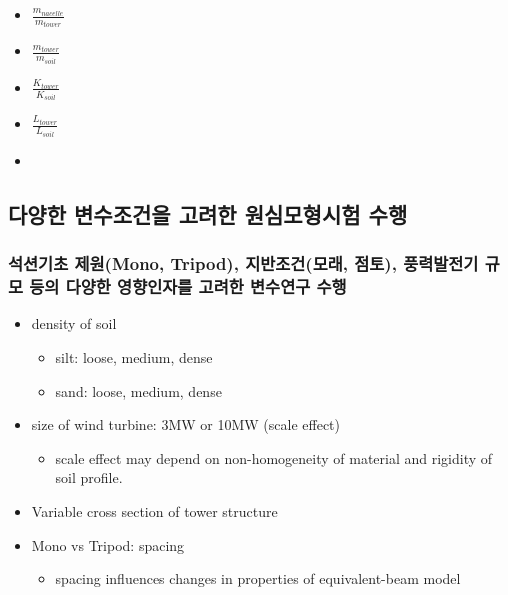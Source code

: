 \documentclass[
  letterpaper,
  DIV=11,
  numbers=noendperiod]{scrreprt}
\providecommand{\tightlist}{%
  \setlength{\itemsep}{0pt}\setlength{\parskip}{0pt}}\usepackage{longtable,booktabs,array}
\begin{document}
\begin{itemize}
\tightlist
\item
  \(\frac{m_{nacelle}}{m_{tower}}\)
\item
  \(\frac{m_{tower}}{m_{soil}}\)
\item
  \(\frac{K_{tower}}{K_{soil}}\)
\item
  \(\frac{L_{tower}}{L_{soil}}\)
\item
\end{itemize}

\hypertarget{uxb2e4uxc591uxd55c-uxbcc0uxc218uxc870uxac74uxc744-uxace0uxb824uxd55c-uxc6d0uxc2ecuxbaa8uxd615uxc2dcuxd5d8-uxc218uxd589}{%
\subsection{다양한 변수조건을 고려한 원심모형시험
수행}\label{uxb2e4uxc591uxd55c-uxbcc0uxc218uxc870uxac74uxc744-uxace0uxb824uxd55c-uxc6d0uxc2ecuxbaa8uxd615uxc2dcuxd5d8-uxc218uxd589}}

\hypertarget{uxc11duxc158uxae30uxcd08-uxc81cuxc6d0mono-tripod-uxc9c0uxbc18uxc870uxac74uxbaa8uxb798-uxc810uxd1a0-uxd48duxb825uxbc1cuxc804uxae30-uxaddcuxbaa8-uxb4f1uxc758-uxb2e4uxc591uxd55c-uxc601uxd5a5uxc778uxc790uxb97c-uxace0uxb824uxd55c-uxbcc0uxc218uxc5f0uxad6c-uxc218uxd589}{%
\subsubsection{석션기초 제원(Mono, Tripod), 지반조건(모래, 점토),
풍력발전기 규모 등의 다양한 영향인자를 고려한 변수연구
수행}\label{uxc11duxc158uxae30uxcd08-uxc81cuxc6d0mono-tripod-uxc9c0uxbc18uxc870uxac74uxbaa8uxb798-uxc810uxd1a0-uxd48duxb825uxbc1cuxc804uxae30-uxaddcuxbaa8-uxb4f1uxc758-uxb2e4uxc591uxd55c-uxc601uxd5a5uxc778uxc790uxb97c-uxace0uxb824uxd55c-uxbcc0uxc218uxc5f0uxad6c-uxc218uxd589}}

\begin{itemize}
\tightlist
\item
  density of soil

  \begin{itemize}
  \tightlist
  \item
    silt: loose, medium, dense
  \item
    sand: loose, medium, dense
  \end{itemize}
\item
  size of wind turbine: 3MW or 10MW (scale effect)

  \begin{itemize}
  \tightlist
  \item
    scale effect may depend on non-homogeneity of material and rigidity
    of soil profile.
  \end{itemize}
\item
  Variable cross section of tower structure
\item
  Mono vs Tripod: spacing

  \begin{itemize}
  \tightlist
  \item
    spacing influences changes in properties of equivalent-beam model
  \end{itemize}
\end{itemize}
\end{document}
